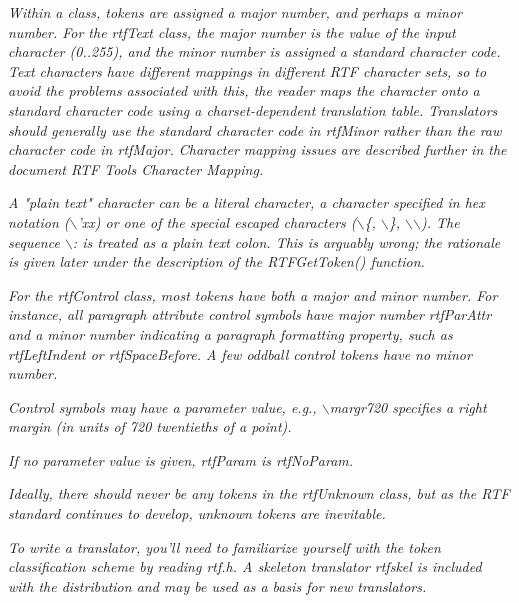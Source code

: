 \documentclass{article}
\begin{document}
\noindent
{\em Within a class, tokens are assigned a major number, and perhaps a minor 
number. For the rtfText class, the major number is the value of the input 
character (0..255), and the minor number is assigned a standard character 
code. Text characters have different mappings in different RTF character 
sets, so to avoid the problems associated with this, the reader maps the 
character onto a standard character code using a charset-dependent translation 
table. Translators should generally use the standard character code in rtfMinor 
rather than the raw character code in rtfMajor. Character mapping issues 
are described further in the document RTF Tools Character Mapping.



\noindent
{\em A "plain text" character can be a literal character, a character specified 
in hex notation ($\backslash $'xx) or one of the special escaped characters 
($\backslash $\{, $\backslash $\}, $\backslash $$\backslash $). The sequence $\backslash $: 
is treated as a plain text colon. This is arguably wrong; the rationale is 
given later under the description of the RTFGetToken() function.



\noindent
{\em For the rtfControl class, most tokens have both a major and minor number. 
For instance, all paragraph attribute control symbols have major number rtfParAttr 
and a minor number indicating a paragraph formatting property, such as rtfLeftIndent 
or rtfSpaceBefore. A few oddball control tokens have no minor number.



\noindent
{\em Control symbols may have a parameter value, e.g., $\backslash $margr720 
specifies a right margin (in units of 720 twentieths of a point).



\noindent
{\em If no parameter value is given, rtfParam is rtfNoParam.



\noindent
{\em Ideally, there should never be any tokens in the rtfUnknown class, but 
as the RTF standard continues to develop, unknown tokens are inevitable.



\noindent
{\em To write a translator, you'll need to familiarize yourself with the 
token classification scheme by reading rtf.h. A skeleton translator rtfskel 
is included with the distribution and may be used as a basis for new translators.



}}}}}}}
\end{document}
